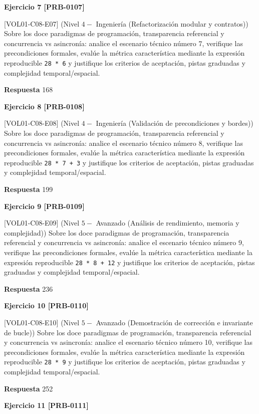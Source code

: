 \documentclass{book}
\begin{document}
\noindent\textbf{Ejercicio 7 [PRB-0107]}

[VOL01-C08-E07] (Nivel \(4 -\) Ingeniería (Refactorización modular y contratos)) Sobre los doce paradigmas de programación, transparencia referencial y concurrencia vs asincronía: analice el escenario técnico número 7, verifique las precondiciones formales, evalúe la métrica característica mediante la expresión reproducible \texttt{28 * 6} y justifique los criterios de aceptación, pistas graduadas y complejidad temporal/espacial.

\noindent\textbf{Respuesta} 168

\noindent\textbf{Ejercicio 8 [PRB-0108]}

[VOL01-C08-E08] (Nivel \(4 -\) Ingeniería (Validación de precondiciones y bordes)) Sobre los doce paradigmas de programación, transparencia referencial y concurrencia vs asincronía: analice el escenario técnico número 8, verifique las precondiciones formales, evalúe la métrica característica mediante la expresión reproducible \texttt{28 * 7 + 3} y justifique los criterios de aceptación, pistas graduadas y complejidad temporal/espacial.

\noindent\textbf{Respuesta} 199

\noindent\textbf{Ejercicio 9 [PRB-0109]}

[VOL01-C08-E09] (Nivel \(5 -\) Avanzado (Análisis de rendimiento, memoria y complejidad)) Sobre los doce paradigmas de programación, transparencia referencial y concurrencia vs asincronía: analice el escenario técnico número 9, verifique las precondiciones formales, evalúe la métrica característica mediante la expresión reproducible \texttt{28 * 8 + 12} y justifique los criterios de aceptación, pistas graduadas y complejidad temporal/espacial.

\noindent\textbf{Respuesta} 236

\noindent\textbf{Ejercicio 10 [PRB-0110]}

[VOL01-C08-E10] (Nivel \(5 -\) Avanzado (Demostración de corrección e invariante de bucle)) Sobre los doce paradigmas de programación, transparencia referencial y concurrencia vs asincronía: analice el escenario técnico número 10, verifique las precondiciones formales, evalúe la métrica característica mediante la expresión reproducible \texttt{28 * 9} y justifique los criterios de aceptación, pistas graduadas y complejidad temporal/espacial.

\noindent\textbf{Respuesta} 252

\noindent\textbf{Ejercicio 11 [PRB-0111]}
\end{document}
